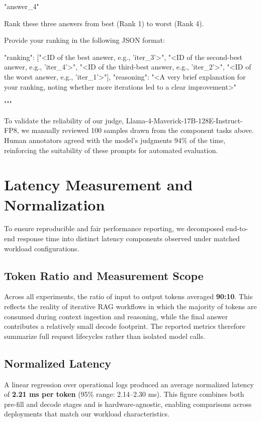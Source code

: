 \documentclass[11pt]{article}
\begin{document}
\begin{PromptBlock}
{  "{answer_4}"

  Rank these three answers from best (Rank 1) to worst (Rank 4).

  Provide your ranking in the following JSON format:

  {{
    "ranking": ["<ID of the best answer, e.g., 'iter_3'>", "<ID of the second-best answer, e.g., 'iter_4'>", "<ID of the third-best answer, e.g., 'iter_2'>", "<ID of the worst answer, e.g., 'iter_1'>"],
    "reasoning": "<A very brief explanation for your ranking, noting whether more iterations led to a clear improvement>"
  }}

  """

}
\end{PromptBlock}

To validate the reliability of our judge, Llama-4-Maverick-17B-128E-Instruct-FP8, we manually reviewed 100 samples drawn from the component tasks above. Human annotators agreed with the model's judgments 94\% of the time, reinforcing the suitability of these prompts for automated evaluation.

\section{Latency Measurement and Normalization}
\label{sec:appendix-metrics}

To ensure reproducible and fair performance reporting, we decomposed end-to-end response time into distinct latency components observed under matched workload configurations.

\subsection{Token Ratio and Measurement Scope}

Across all experiments, the ratio of input to output tokens averaged \textbf{90:10}. This reflects the reality of iterative RAG workflows in which the majority of tokens are consumed during context ingestion and reasoning, while the final answer contributes a relatively small decode footprint. The reported metrics therefore summarize full request lifecycles rather than isolated model calls.

\subsection{Normalized Latency}

A linear regression over operational logs produced an average normalized latency of \textbf{2.21 ms per token} (95\% range: 2.14--2.30 ms). This figure combines both pre-fill and decode stages and is hardware-agnostic, enabling comparisons across deployments that match our workload characteristics.
\end{document}
